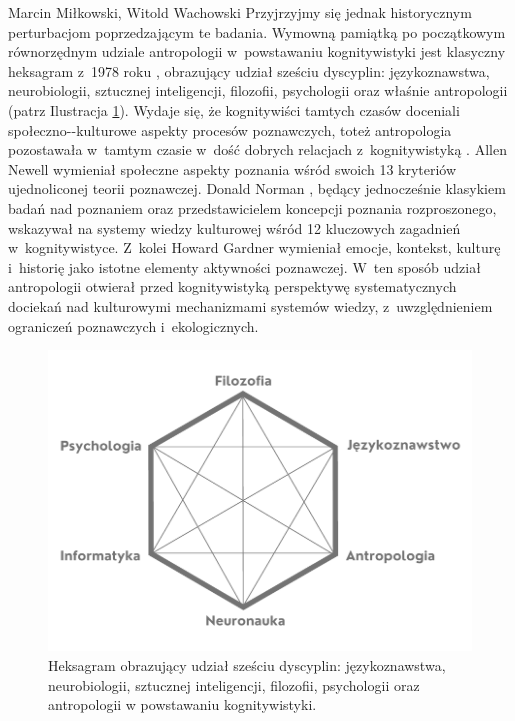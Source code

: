 \begin{artplenv2auth}{Marcin Miłkowski, Witold Wachowski}
Przyjrzyjmy się jednak historycznym perturbacjom poprzedzającym te badania. Wymowną pamiątką po początkowym równorzędnym udziale antropologii w~powstawaniu kognitywistyki jest klasyczny heksagram z~1978 roku
\parencite[zob. np. ][]{miller_cognitive_2003}, %
 obrazujący udział sześciu dyscyplin: językoznawstwa, neurobiologii, sztucznej inteligencji, filozofii, psychologii oraz właśnie antropologii (patrz Ilustracja \ref{fig1milk}). Wydaje się, że kognitywiści tamtych czasów doceniali społeczno-\mbox{-kulturowe} aspekty procesów poznawczych, toteż antropologia pozostawała w~tamtym czasie w~dość dobrych relacjach z~kognitywistyką 
\parencite[][]{bender_anthropology_2010}. %
 Allen Newell 
\parencites*[][]{newell_physical_1980}[][]{newell_unified_1990} %
 wymieniał społeczne aspekty poznania wśród swoich 13 kryteriów ujednoliconej teorii poznawczej. Donald Norman 
\parencite*[][]{norman_twelve_1981}, %
 będący jednocześnie klasykiem badań nad poznaniem oraz przedstawicielem koncepcji poznania rozproszonego, wskazywał na systemy wiedzy kulturowej wśród 12 kluczowych zagadnień w~kognitywistyce. Z~kolei Howard Gardner 
\parencite*[][]{gardner_minds_1985} %
 wymieniał emocje, kontekst, kulturę i~historię jako istotne elementy aktywności poznawczej. W~ten sposób udział antropologii otwierał przed kognitywistyką perspektywę systematycznych dociekań nad kulturowymi mechanizmami systemów wiedzy, z~uwzględnieniem ograniczeń poznawczych i~ekologicznych.
 

\begin{figure}
\begin{center}
 \includegraphics[width=.9\textwidth]{ART_milkowski/ilustracja1pu.pdf}
\end{center}
 \caption{Heksagram obrazujący udział sześciu dyscyplin: językoznawstwa, neurobiologii, sztucznej inteligencji, filozofii, psychologii oraz antropologii w powstawaniu kognitywistyki.}\label{fig1milk}
\end{figure}


\end{artplenv2auth}
